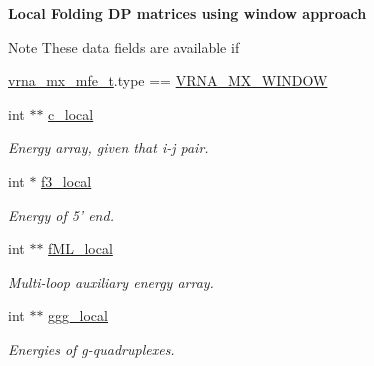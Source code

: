 \begin{Indent}{\bf Local Folding D\+P matrices using window approach}\par
{\em \begin{DoxyNote}{Note}
These data fields are available if 
\begin{DoxyCode}
\hyperlink{group__dp__matrices_structvrna__mx__mfe__s}{vrna\_mx\_mfe\_t}.type == \hyperlink{group__dp__matrices_gga6042ea1d58d01931e959791be6d89343a2ea5d5947f6ec02544934b0ff2785e99}{VRNA\_MX\_WINDOW} 
\end{DoxyCode}
 
\end{DoxyNote}
}\begin{DoxyCompactItemize}
\item 
\hypertarget{group__dp__matrices_a116c677ece0832e6ab9cc2fd1ebfe452}{int $\ast$$\ast$ \hyperlink{group__dp__matrices_a116c677ece0832e6ab9cc2fd1ebfe452}{c\+\_\+local}}\label{group__dp__matrices_a116c677ece0832e6ab9cc2fd1ebfe452}

\begin{DoxyCompactList}\small\item\em Energy array, given that i-\/j pair. \end{DoxyCompactList}\item 
\hypertarget{group__dp__matrices_a6eae0a2b696b0c63bbaa78a70b950600}{int $\ast$ \hyperlink{group__dp__matrices_a6eae0a2b696b0c63bbaa78a70b950600}{f3\+\_\+local}}\label{group__dp__matrices_a6eae0a2b696b0c63bbaa78a70b950600}

\begin{DoxyCompactList}\small\item\em Energy of 5' end. \end{DoxyCompactList}\item 
\hypertarget{group__dp__matrices_ad37d705240a8e6b1e9a4e4ea19e74003}{int $\ast$$\ast$ \hyperlink{group__dp__matrices_ad37d705240a8e6b1e9a4e4ea19e74003}{f\+M\+L\+\_\+local}}\label{group__dp__matrices_ad37d705240a8e6b1e9a4e4ea19e74003}

\begin{DoxyCompactList}\small\item\em Multi-\/loop auxiliary energy array. \end{DoxyCompactList}\item 
\hypertarget{group__dp__matrices_afd3ea65bc8f06559f7f1ea79072fa385}{int $\ast$$\ast$ \hyperlink{group__dp__matrices_afd3ea65bc8f06559f7f1ea79072fa385}{ggg\+\_\+local}}\label{group__dp__matrices_afd3ea65bc8f06559f7f1ea79072fa385}

\begin{DoxyCompactList}\small\item\em Energies of g-\/quadruplexes. \end{DoxyCompactList}\end{DoxyCompactItemize}
\end{Indent}
